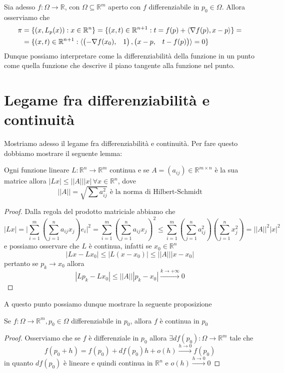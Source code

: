 \documentclass[openany]{book}
\begin{document}
Sia adesso $f: \Omega \to \mathbb{R}$, con $\Omega \subseteq \mathbb{R}^m$ aperto con $f$ differenziabile in $p_0 \in \Omega$. Allora osserviamo che
\begin{align*}
\pi &= \{ (x, L_p(x)) : x \in \mathbb{R}^n \} = \{ (x, t) \in \mathbb{R}^{n+1} : t = f(p) + \langle \nabla{f(p)}, x-p \rangle \} = \\
&= \{ (x, t) \in \mathbb{R}^{n+1} : \langle \begin{pmatrix} -\nabla{f(x_0)}, & 1 \end{pmatrix}, \begin{pmatrix} x-p, & t-f(p) \end{pmatrix} \rangle = 0 \}
\end{align*}
Dunque possiamo interpretare come la differenziabilità della funzione in un punto come quella funzione che descrive il piano tangente alla funzione nel punto.
\section{Legame fra differenziabilità e continuità}
Mostriamo adesso il legame fra differenziabilità e continuità. Per fare questo dobbiamo mostrare il seguente lemma:
\begin{lemma}
Ogni funzione lineare $L: \mathbb{R}^n \to \mathbb{R}^m$ continua e se $A = (a_{ij}) \in \mathbb{R}^{m \times n}$ è la sua matrice allora $|Lx| \leq || A || |x|  \, \forall x \in \mathbb{R}^n$, dove
$$
|| A || = \sqrt{\sum a_{ij}^2} \text{ è la norma di Hilbert-Schmidt}
$$
\end{lemma}
\begin{proof}
Dalla regola del prodotto matriciale abbiamo che
$$
|Lx| = \Bigg| \sum_{i=1}^m \left( \sum_{j=1}^n a_{ij} x_j \right)e_i \Bigg|^2 = \sum_{i=1}^m \left( \sum_{j=1}^n a_{ij} x_j \right)^2 \leq \sum_{i=1}^m \left( \sum_{j=1}^n a_{ij}^2 \right)  \left( \sum_{j=1}^n x_j^2 \right) = || A ||^2 |x|^2
$$
e possiamo osservare che $L$ è continua, infatti se $x_0 \in \mathbb{R}^n$
$$
|Lx - Lx_0| \leq |L(x-x_0)| \leq || A || |x-x_0|
$$
pertanto se $p_k \to x_0$ allora
$$
|Lp_k - Lx_0| \leq || A || |p_k-x_0| \stackrel{k \to +\infty}{\to} 0
$$
\end{proof}
A questo punto possiamo dunque mostrare la seguente proposizione
\begin{prop}
Se $f: \Omega \to \mathbb{R}^m, p_0 \in \Omega$ differenziabile in $p_0$, allora $f$ è continua in $p_0$
\end{prop}
\begin{proof}
Osserviamo che se $f$ è differenziale in $p_0$ allora $\exists df(p_0): \Omega \to \mathbb{R}^m$ tale che
$$
f(p_0 + h) = f(p_0) + df(p_0)h + o(h) \stackrel{h \to 0}{\to} f(p_0)
$$
in quanto $df(p_0)$ è lineare e quindi continua in $\mathbb{R}^n$ e $o(h) \stackrel{h \to 0}{\to} 0$
\end{proof}
\end{document}
